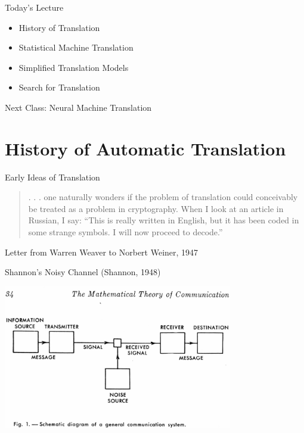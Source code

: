 \documentclass{beamer}
\begin{document}
\begin{frame}{Today's Lecture}
  \begin{itemize}
  \item History of Translation
    \air 

  \item Statistical Machine Translation 
    \air 

  \item Simplified Translation Models
    \air
 
  \item Search for Translation
  \end{itemize}
  \air 

  Next Class: Neural Machine Translation
\end{frame}

\section{History of Automatic Translation}

\begin{frame}{Early Ideas of Translation}
  \begin{quote}
    . . . one naturally wonders if the problem of translation could
conceivably be treated as a problem in cryptography. When I
look at an article in Russian, I say: “This is really written in
English, but it has been coded in some strange symbols. I will
now proceed to decode.”
  \end{quote}
  Letter from Warren Weaver to Norbert Weiner, 1947
\end{frame}

\begin{frame}{Shannon's Noisy Channel (Shannon, 1948)}
  \begin{center}
    \includegraphics[width=10cm]{shannonchannel}
  \end{center}
\end{frame}
\end{document}
